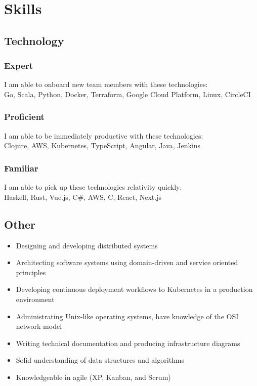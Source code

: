 \documentclass[letterpaper,12pt,oneside]{article}
\begin{document}
\section*{Skills}
\subsection*{Technology}
\subsubsection*{Expert}
I am able to onboard new team members with these technologies:\\
Go, Scala, Python, Docker, Terraform, Google Cloud Platform, Linux, CircleCI
\subsubsection*{Proficient}
I am able to be immediately productive with these technologies:\\
Clojure, AWS, Kubernetes, TypeScript, Angular, Java, Jenkins
\subsubsection*{Familiar}
I am able to pick up these technologies relativity quickly:\\
Haskell, Rust, Vue.js, C\#, AWS, C, React, Next.js
\subsection*{Other}
\begin{itemize}
      \setlength\itemsep{0em}
      \item Designing and developing distributed systems
      \item Architecting software systems using domain-driven and service oriented principles
      \item Developing continuous deployment workflows to Kubernetes in a production environment
      \item Administrating Unix-like operating systems, have knowledge of the OSI network model
      \item Writing technical documentation and producing infrastructure diagrams
      \item Solid understanding of data structures and algorithms
      \item Knowledgeable in agile (XP, Kanban, and Scrum)
\end{itemize}
\end{document}
